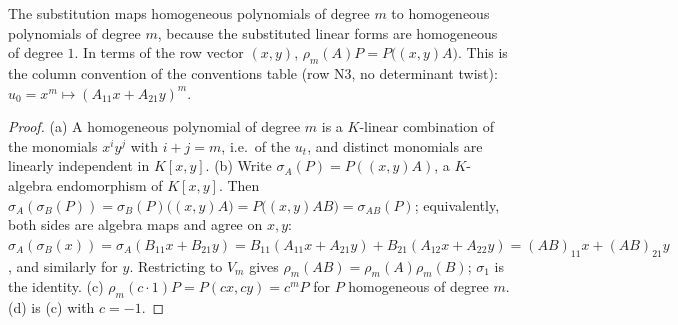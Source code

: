 \begin{definition}
\end{definition}
\noindent The substitution maps homogeneous polynomials of degree $m$ to homogeneous polynomials of degree $m$, because the substituted linear
forms are homogeneous of degree $1$. In terms of the row vector $(x,y)$, $\rho_m(A)P=P\bigl((x,y)A\bigr)$. This is the column convention of the
conventions table (row N3, no determinant twist): $u_0=x^m\mapsto(A_{11}x+A_{21}y)^m$.

\begin{lemma}
\end{lemma}
\begin{proof}
(a) A homogeneous polynomial of degree $m$ is a $K$-linear combination of the monomials $x^iy^j$ with $i+j=m$, i.e.\ of the $u_t$, and distinct
monomials are linearly independent in $K[x,y]$. (b) Write $\sigma_A(P)=P((x,y)A)$, a $K$-algebra endomorphism of $K[x,y]$. Then
$\sigma_A(\sigma_B(P))=\sigma_B(P)\bigl((x,y)A\bigr)=P\bigl((x,y)AB\bigr)=\sigma_{AB}(P)$; equivalently, both sides are algebra maps and agree on
$x,y$: $\sigma_A(\sigma_B(x))=\sigma_A(B_{11}x+B_{21}y)=B_{11}(A_{11}x+A_{21}y)+B_{21}(A_{12}x+A_{22}y)=(AB)_{11}x+(AB)_{21}y$, and similarly for
$y$. Restricting to $V_m$ gives $\rho_m(AB)=\rho_m(A)\rho_m(B)$; $\sigma_1$ is the identity. (c) $\rho_m(c\cdot1)P=P(cx,cy)=c^mP$ for $P$
homogeneous of degree $m$. (d) is (c) with $c=-1$.
\end{proof}

